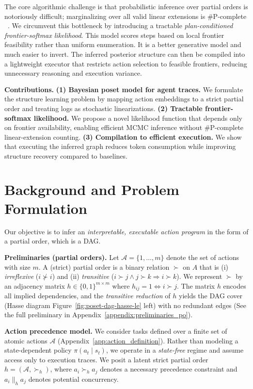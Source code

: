 \documentclass{article}
\theoremstyle{plain}
\theoremstyle{definition}
\theoremstyle{remark}
\begin{document}
The core algorithmic challenge is that probabilistic inference over partial orders is notoriously difficult; marginalizing over all valid linear extensions is \#P-complete ~\citep{brightwell1991counting}. We circumvent this bottleneck by introducing a tractable \emph{plan-conditioned frontier-softmax likelihood}. This model scores steps based on local frontier feasibility rather than uniform enumeration. It is a better generative model and much easier to invert. The inferred posterior structure can then be compiled into a lightweight executor that restricts action selection to feasible frontiers, reducing unnecessary reasoning and execution variance.

\noindent \textbf{Contributions.}
\textbf{(1) Bayesian poset model for agent traces.} We formulate the structure learning problem by mapping action embeddings to a strict partial order and treating logs as stochastic linearizations.
\textbf{(2) Tractable frontier-softmax likelihood.} We propose a novel likelihood function that depends only on frontier availability, enabling efficient MCMC inference without \#P-complete linear-extension counting.
\textbf{(3) Compilation to efficient execution.} We show that executing the inferred graph reduces token consumption while improving structure recovery compared to baselines.


\section{Background and Problem Formulation}
\label{sec:background}
Our objective is to infer an \emph{interpretable, executable action program} in the form of a partial order, which is a DAG.  

\noindent \textbf{Preliminaries (partial orders).}
Let $\mathcal{A}=\{1,\dots,m\}$ denote the set of actions with size $m$.
A (strict) partial order is a binary relation $\succ$ on $A$ that is
(i) \emph{irreflexive} ($i \not\succ i$) and (ii) \emph{transitive}
($i \succ j \wedge j \succ k \Rightarrow i \succ k$).
We represent $\succ$ by an adjacency matrix $h\in\{0,1\}^{m\times m}$ where
$h_{ij}=1 \iff i \succ j$.
The matrix $h$ encodes all implied dependencies, and the \emph{transitive reduction} of $h$ yields the DAG cover (Hasse diagram Figure~\ref{fig:poset-dag-hasse-le} left) with no redundant edges (See the full preliminary in Appendix~\ref{appendix:preliminaries_po}).

\noindent \textbf{Action precedence model.} We consider tasks defined over a finite set of atomic actions $\mathcal{A}$ (Appendix~\ref{app:action_definition}).
Rather than modeling a state-dependent policy $\pi(a_t \mid s_t)$, we operate in a
\emph{state-free} regime and assume access only to execution traces.
We posit a latent strict partial order $h=(\mathcal{A},\succ_h)$, where
$a_i \succ_h a_j$ denotes a necessary precedence constraint and
$a_i \parallel_h a_j$ denotes potential concurrency.
\end{document}
